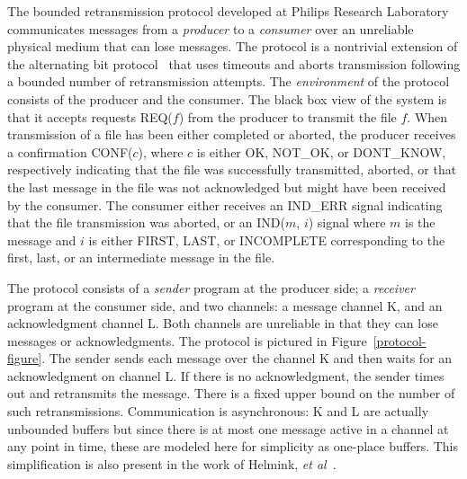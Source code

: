 


\renewcommand{\mth}[1]{$#1$}

The bounded retransmission protocol developed at Philips Research
Laboratory communicates messages  from a  {\em  producer} to a  {\em
consumer}  over an  unreliable physical  medium that can lose 
messages.  The protocol  is a
nontrivial extension  of the  alternating bit
protocol~\cite{Bartlett69:ABP} that uses timeouts and aborts transmission
following a bounded number of retransmission attempts.   
The {\em environment}  of the protocol consists of
the producer  and the consumer.  The black box view of the system
is that it accepts requests REQ(\mth{f}) from the producer to transmit
the file \mth{f}\@.  When transmission of a file
has been either completed or aborted, the producer receives a
confirmation CONF(\mth{c}), where \mth{c} is either OK, NOT\_OK, or
DONT\_KNOW, respectively indicating that the file was successfully
transmitted, aborted, or that the last message in the file was not
acknowledged but might have been received by the consumer.
The consumer either receives an IND\_ERR signal indicating that
the file transmission was aborted, or an IND(\mth{m}, \mth{i}) signal where
\mth{m} is the message and \mth{i} is either FIRST, LAST,
or
INCOMPLETE
corresponding to the first, last, or an intermediate message in the file.

The protocol consists of a {\em sender}  program at the producer side;
a {\em  receiver} program  at the  consumer side,  and two channels: a
message channel K, and an acknowledgment channel
L.  Both  channels are unreliable in that they can lose
messages or acknowledgments.    The
protocol is  pictured in  Figure~\ref{protocol-figure}.  The   sender
sends each message  over the  channel K  and then waits  for an
acknowledgment    on    channel L.   If   there is no
acknowledgment, the sender times  out and retransmits the
message.   There  is   a fixed  upper   bound on    the  number   of   such
retransmissions.   Communication is asynchronous: K and
L are actually unbounded buffers but since there is at most
one message active in a channel at any point in time, these are modeled here
for simplicity as one-place buffers.  This simplification
is also present in the work of Helmink, {\em et al\/}~\cite{HSV:Protocol.Coq}.

